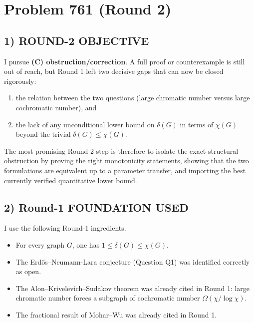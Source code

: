 \section*{Problem 761 (Round 2)}

\subsection*{1) ROUND-2 OBJECTIVE}
I pursue \textbf{(C) obstruction/correction}. A full proof or counterexample is still out of reach, but Round 1 left two decisive gaps that can now be closed rigorously:
\begin{enumerate}
\item the relation between the two questions (large chromatic number versus large cochromatic number), and
\item the lack of any unconditional lower bound on $\delta(G)$ in terms of $\chi(G)$ beyond the trivial $\delta(G)\le \chi(G)$.
\end{enumerate}
The most promising Round-2 step is therefore to isolate the exact structural obstruction by proving the right monotonicity statements, showing that the two formulations are equivalent up to a parameter transfer, and importing the best currently verified quantitative lower bound.

\subsection*{2) Round-1 FOUNDATION USED}
I use the following Round-1 ingredients.
\begin{itemize}
\item For every graph $G$, one has $1\le \delta(G)\le \chi(G)$.
\item The Erd\H{o}s--Neumann-Lara conjecture (Question Q1) was identified correctly as open.
\item The Alon--Krivelevich--Sudakov theorem was already cited in Round 1: large chromatic number forces a subgraph of cochromatic number $\Omega(\chi/\log\chi)$.
\item The fractional result of Mohar--Wu was already cited in Round 1.
\end{itemize}

